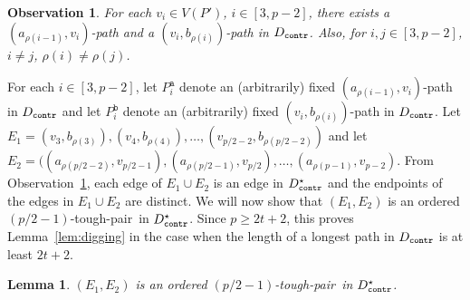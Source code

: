 \documentclass[a4paper,11pt]{article}
\theoremstyle{plain}
\newtheorem{lemma}[theorem]{Lemma}
\newtheorem{observation}[theorem]{Observation}
\newtheorem{identification rule}{Identification Rule}
\theoremstyle{definition}
\theoremstyle{remark}
\newcommand{\toughpair}{tough-pair}
\newcommand{\contr}{\textnormal{\texttt{contr}}}
\newcommand{\Dcontr}{D_{\contr}}
\newcommand{\aaa}{\texttt{a}}
\newcommand{\bbb}{\texttt{b}}
\begin{document}
\begin{observation}\label{obs:biclique1}
For each $v_i \in V(P')$, $i \in [3, p-2]$, there exists a $(a_{\rho(i-1)},v_i)$-path and a $(v_i, b_{\rho(i)})$-path in $\Dcontr$.  Also, for $i,j \in [3,p-2]$, $i \neq j$, $\rho(i) \neq \rho(j)$.
\end{observation}

For each $i \in [3,p-2]$, let $P^{\aaa}_i$ denote an (arbitrarily) fixed $(a_{\rho(i-1)},v_i)$-path in $\Dcontr$ and let $P^{\bbb}_i$ denote an (arbitrarily) fixed $(v_i,b_{\rho(i)})$-path in $\Dcontr$.
Let $E_1 = (v_3, b_{\rho(3)}), \allowbreak  (v_4, b_{\rho(4)}), \ldots, \allowbreak (v_{p/2-2}, b_{\rho(p/2-2)})$ and let 
 $E_2 = ((a_{\rho(p/2-2)},v_{p/2-1}), \allowbreak  (a_{\rho(p/2-1)}, \allowbreak v_{p/2}), \ldots, (a_{\rho(p-1)}, \allowbreak v_{p-2})$. 
 From Observation~\ref{obs:biclique1}, each edge of $E_1 \cup E_2$ is an edge in $D^{\star}_{\contr}$ and the endpoints of the edges in $E_1 \cup E_2$ are distinct. We will now show that $(E_1,E_2)$ is an ordered $(p/2-1)$-\toughpair\ in $D^{\star}_{\contr}$. Since $p \geq 2t+2$, this proves Lemma~\ref{lem:digging} in the case when the length of a longest path in $\Dcontr$ is at least $2t+2$.
 
\begin{lemma}\label{lem:long-path-ordered-tough-pair}
$(E_1,E_2)$ is an ordered $(p/2-1)$-\toughpair\ in $D^{\star}_{\contr}$.
\end{lemma}
\end{document}
